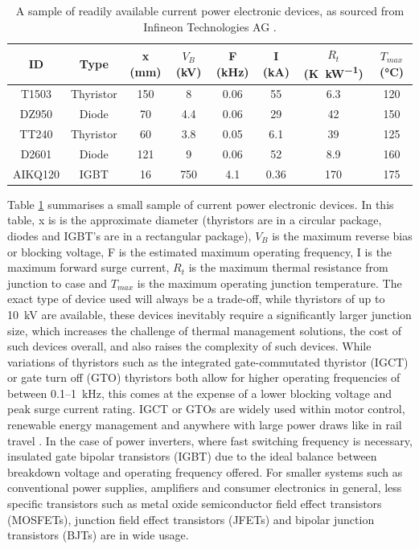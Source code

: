 \begin{refsection}
\begin{table}[H]
\centering
\begin{tabular}{|c|c|c|c|c|c|c|c|}
\hline
ID          & Type & x (\si{\milli\metre}) & $V_{B}$ (\si{\kilo\volt}) & F (\si{\kilo\hertz}) & I (\si{\kilo\ampere}) & $R_{t}$ (\si{\kelvin\per\kilo\watt}) & $T_{max}$ (°C)  \\ \hline

T1503             & Thyristor & 150 & 8   & 0.06  & 55  & 6.3  & 120   \\ \hline
DZ950                & Diode     & 70  & 4.4   & 0.06  & 29  & 42   & 150   \\ \hline
TT240               & Thyristor & 60  & 3.8 & 0.05   & 6.1  & 39  & 125    \\ \hline
D2601               & Diode    & 121  & 9   & 0.06  & 52   & 8.9    & 160    \\ \hline
AIKQ120        & IGBT     & 16   & 750    & 4.1  & 0.36    & 170   & 175    \\ \hline
\end{tabular}
\caption{A sample of readily available current power electronic devices, as sourced from Infineon Technologies AG \cite{infineon:T1503N, infineon:DZ950N, infineon:TT240N, infineon:D2601N, infineon:AIKQ120N75CP2}.}
\label{tab:components}
\end{table}

Table \ref{tab:components} summarises a small sample of current power electronic devices. In this table, x is is the approximate diameter (thyristors are in a circular package, diodes and IGBT's are in a rectangular package), $V_{B}$ is the maximum reverse bias or blocking voltage, F is the estimated maximum operating frequency, I is the maximum forward surge current, $R_{t}$ is the maximum thermal resistance from junction to case and $T_{max}$ is the maximum operating junction temperature. The exact type of device used will always be a trade-off, while thyristors of up to 10~\si{\kilo\volt} are available, these devices inevitably require a significantly larger junction size, which increases the challenge of thermal management solutions, the cost of such devices overall, and also raises the complexity of such devices. While variations of thyristors such as the integrated gate-commutated thyristor (IGCT) or gate turn off (GTO) thyristors both allow for higher operating frequencies of between 0.1--1~\si{\kilo\hertz}, this comes at the expense of a lower blocking voltage and peak surge current rating. IGCT or GTOs are widely used within motor control, renewable energy management and anywhere with large power draws like in rail travel \cite{Tolbert2005}. In the case of power inverters, where fast switching frequency is necessary, insulated gate bipolar transistors (IGBT) due to the ideal balance between breakdown voltage and operating frequency offered. For smaller systems such as conventional power supplies, amplifiers and consumer electronics in general, less specific transistors such as metal oxide semiconductor field effect transistors (MOSFETs), junction field effect transistors (JFETs) and bipolar junction transistors (BJTs) are in wide usage.


\end{refsection}
